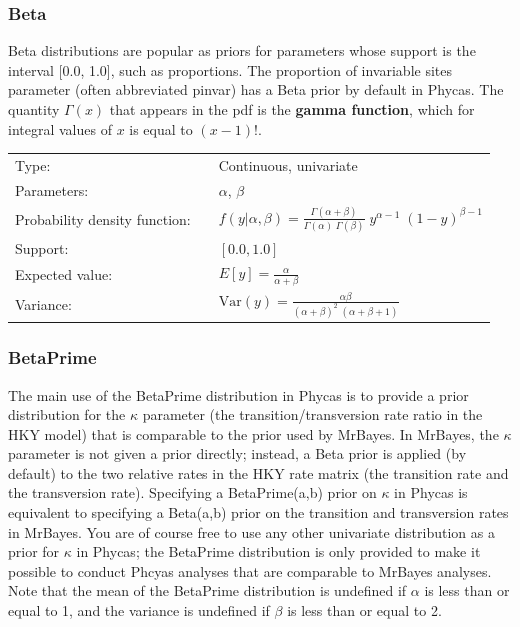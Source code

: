 \documentclass[10pt]{article}
\newcommand{\term}[1]{{\bfseries #1}\index{#1}}	%
\newcommand{\Var}{\mbox{Var}}
\begin{document}
\subsubsection{Beta}

Beta distributions are popular as priors for parameters whose support is the interval [0.0, 1.0], such as proportions. The proportion of invariable sites parameter (often abbreviated pinvar) has a Beta prior by default in Phycas. The quantity $\Gamma(x)$ that appears in the pdf is the \term{gamma function}, which for integral values of $x$ is equal to $(x-1)!$.

\begin{tabular}{lcl}
Type:                 & & Continuous, univariate \\
Parameters:           & & $\alpha$, $\beta$   \\
Probability density function: & & $f(y|\alpha, \beta) = \frac{\Gamma(\alpha + \beta)}{\Gamma(\alpha) \; \Gamma(\beta)} \; y^{\alpha-1} \; (1-y)^{\beta - 1}$ \\
Support:              & & $[0.0,1.0]$     \\
Expected value:       & & $E[y] = \frac{\alpha}{\alpha + \beta}$ \\
Variance:             & & $\Var(y) = \frac{\alpha \beta}{(\alpha + \beta)^2 \; (\alpha + \beta + 1)}$ 
\end{tabular}

\subsubsection{BetaPrime}

The main use of the BetaPrime distribution in Phycas is to provide a prior distribution for the $\kappa$ parameter (the transition/transversion rate ratio in the HKY model) that is comparable to the prior used by MrBayes. In MrBayes, the $\kappa$ parameter is not given a prior directly; instead, a Beta prior is applied (by default) to the two relative rates in the HKY rate matrix (the transition rate and the transversion rate). Specifying a BetaPrime(a,b) prior on $\kappa$ in Phycas is equivalent to specifying a Beta(a,b) prior on the transition and transversion rates in MrBayes. You are of course free to use any other univariate distribution as a prior for $\kappa$ in Phycas; the BetaPrime distribution is only provided to make it possible to conduct Phcyas analyses that are comparable to MrBayes analyses. Note that the mean of the BetaPrime distribution is undefined if $\alpha$ is less than or equal to 1, and the variance is undefined if $\beta$ is less than or equal to 2.
\end{document}

